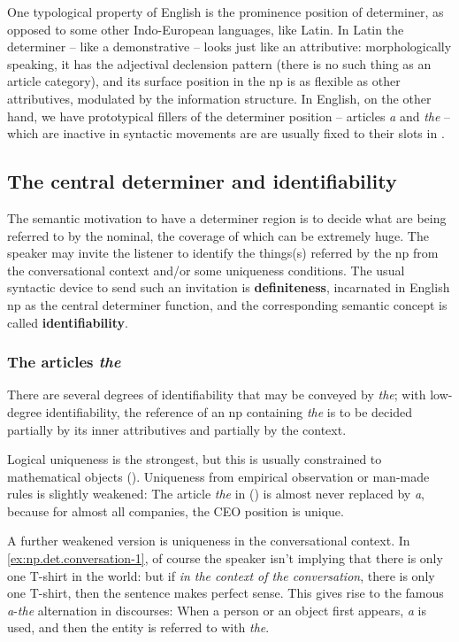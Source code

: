 \documentclass[UTF8, a4paper, oneside, scheme=plain, 12pt]{ctexbook}
\newcommand*{\concept}[1]{\textbf{#1}}
\newcommand{\form}[1]{\emph{#1}}
\begin{document}
One typological property of English is 
the prominence position of determiner,
as opposed to some other Indo-European languages, like Latin.
In Latin the determiner -- like a demonstrative -- 
looks just like an attributive:
morphologically speaking, it has the adjectival declension pattern
(there is no such thing as an article category),
and its surface position in the \acs{np} 
is as flexible as other attributives,
modulated by the information structure.
In English, on the other hand, we have prototypical fillers of the determiner position
-- articles \form{a} and \form{the} -- 
which are inactive in syntactic movements 
are are usually fixed to their slots in .

\subsection{The central determiner and identifiability }\label{sec:np.det.definite}

The semantic motivation to have a determiner region is 
to decide what are being referred to by the nominal,
the coverage of which can be extremely huge.
The speaker may invite the listener to 
identify the things(s) referred by the \acs{np} 
from the conversational context
and/or some uniqueness conditions.
The usual syntactic device to send such an invitation 
is \concept{definiteness},
incarnated in English \acs{np} as the central determiner function,
and the corresponding semantic concept is called \concept{identifiability}.




\subsubsection{The articles \form{the}}

There are several degrees of identifiability that may be conveyed by \form{the};
with low-degree identifiability, 
the reference of an \acs{np} containing \form{the} is 
to be decided partially by its inner attributives and partially by the context.

Logical uniqueness is the strongest, 
but this is usually constrained to mathematical objects
().
Uniqueness from empirical observation or man-made rules is slightly weakened:
The article \form{the} in ()
is almost never replaced by \form{a},
because for almost all companies,
the CEO position is unique.

A further weakened version is uniqueness in the conversational context.
In \eqref{ex:np.det.conversation-1}, 
of course the speaker isn't implying that there is only one T-shirt in the world:
but if \emph{in the context of the conversation},
there is only one T-shirt,
then the sentence makes perfect sense.
This gives rise to the famous \form{a}-\form{the} alternation in discourses:
When a person or an object first appears,
\form{a} is used,
and then the entity is referred to with \form{the}.
\end{document}
